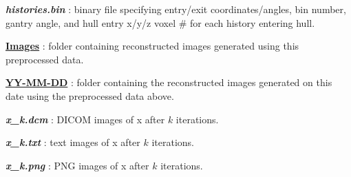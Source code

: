 \documentclass[landscape]{article}
\begin{document}
\begin{myEnumerate}[labelindent=0pt, leftmargin=*]
\begin{myEnumerate}[labelindent=1pt, leftmargin=*]
\begin{myEnumerate}[labelindent=1pt, leftmargin=*]
\begin{myEnumerate}[labelindent=1pt, leftmargin=*]
\begin{myEnumerate}[labelindent=1pt, leftmargin=*]
\begin{myEnumerate}[labelindent=1pt, leftmargin=*]
\begin{myEnumerate}[labelindent=1pt, leftmargin=*]
\begin{myEnumerate}[labelindent=1pt, leftmargin=*]
\begin{myEnumerate}[labelindent=1pt, leftmargin=*]
                                    \item \textbf{\textit{histories.bin}} : binary file specifying entry/exit coordinates/angles, bin number, gantry angle, and hull entry x/y/z voxel \# for each history entering hull.
                                    \item \ul{\textbf{Images}} : folder containing reconstructed images generated using this preprocessed data.
                                    \begin{myEnumerate}[labelindent=1pt, leftmargin=*]
                                        \item \ul{\textbf{YY-MM-DD}} : folder containing the reconstructed images generated on this date using the preprocessed data above.
                                            \begin{myEnumerate}[labelindent=1pt, leftmargin=*]
                                                \item \textbf{\textit{x\_k.dcm}} : DICOM images of x after $k$ iterations.
                                                \item \textbf{\textit{x\_k.txt}} : text images of x after $k$ iterations.
                                                \item \textbf{\textit{x\_k.png}} : PNG images of x after $k$ iterations.
                                            \end{myEnumerate}
                                    \end{myEnumerate}
                                \end{myEnumerate}
                            \end{myEnumerate}
                        \end{myEnumerate}
                    \end{myEnumerate}
                \end{myEnumerate}
            \end{myEnumerate}
        \end{myEnumerate}
    \end{myEnumerate}
\end{myEnumerate}
\newpage
\end{document}
